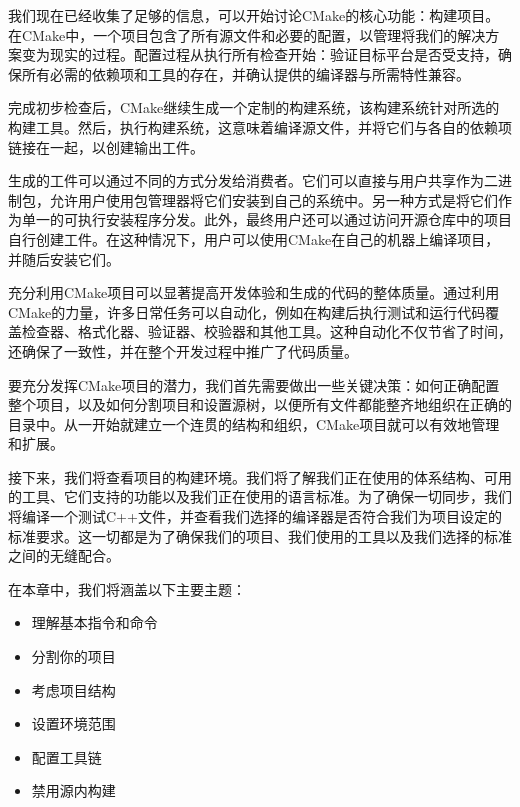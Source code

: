我们现在已经收集了足够的信息，可以开始讨论CMake的核心功能：构建项目。在CMake中，一个项目包含了所有源文件和必要的配置，以管理将我们的解决方案变为现实的过程。配置过程从执行所有检查开始：验证目标平台是否受支持，确保所有必需的依赖项和工具的存在，并确认提供的编译器与所需特性兼容。

完成初步检查后，CMake继续生成一个定制的构建系统，该构建系统针对所选的构建工具。然后，执行构建系统，这意味着编译源文件，并将它们与各自的依赖项链接在一起，以创建输出工件。

生成的工件可以通过不同的方式分发给消费者。它们可以直接与用户共享作为二进制包，允许用户使用包管理器将它们安装到自己的系统中。另一种方式是将它们作为单一的可执行安装程序分发。此外，最终用户还可以通过访问开源仓库中的项目自行创建工件。在这种情况下，用户可以使用CMake在自己的机器上编译项目，并随后安装它们。

充分利用CMake项目可以显著提高开发体验和生成的代码的整体质量。通过利用CMake的力量，许多日常任务可以自动化，例如在构建后执行测试和运行代码覆盖检查器、格式化器、验证器、校验器和其他工具。这种自动化不仅节省了时间，还确保了一致性，并在整个开发过程中推广了代码质量。

要充分发挥CMake项目的潜力，我们首先需要做出一些关键决策：如何正确配置整个项目，以及如何分割项目和设置源树，以便所有文件都能整齐地组织在正确的目录中。从一开始就建立一个连贯的结构和组织，CMake项目就可以有效地管理和扩展。

接下来，我们将查看项目的构建环境。我们将了解我们正在使用的体系结构、可用的工具、它们支持的功能以及我们正在使用的语言标准。为了确保一切同步，我们将编译一个测试C++文件，并查看我们选择的编译器是否符合我们为项目设定的标准要求。这一切都是为了确保我们的项目、我们使用的工具以及我们选择的标准之间的无缝配合。

在本章中，我们将涵盖以下主要主题：

\begin{itemize}
\item
理解基本指令和命令

\item
分割你的项目

\item
考虑项目结构

\item
设置环境范围

\item
配置工具链

\item
禁用源内构建
\end{itemize}